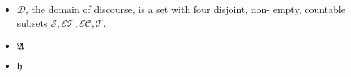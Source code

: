 \begin{itemize}
	\item $\mathcal{D}$,  the domain of discourse, is a set with four disjoint, non-
	      empty, countable subsets $\mathcal{S} , \mathcal{ET}, \mathcal{EC},  \mathcal{T}$.
	\item $\mathfrak{A}$

	\item $\mathfrak{h}$


\end{itemize}
